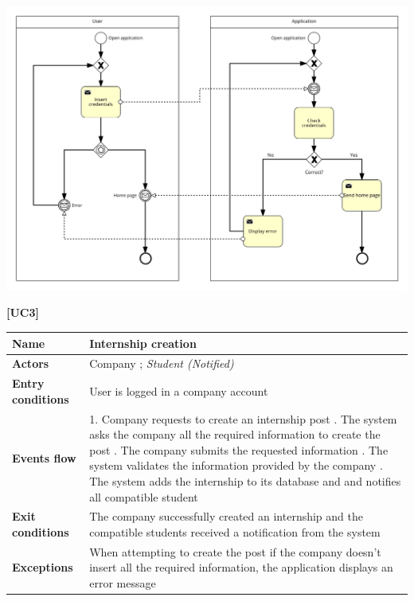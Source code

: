 \documentclass[11pt,twoside]{article}
\begin{document}
\begin{center}
\includegraphics[width=\textwidth]{Images/UC2}
\end{center}

\newpage

\large{\textbf{[UC3]}} \\
\begin{table}[H]
\begin{tabular}{| p{} | p{} |}
\hline
\textbf{Name}
& Internship creation \\
\hline
\textbf{Actors}
& Company ; \textit{Student (Notified)} \\
\hline
\textbf{Entry conditions}
& User is logged in a company account \\
\hline
\textbf{Events flow}
& 1. Company requests to create an internship post \newline
2. The system asks the company all the required information to create the post \newline
3. The company submits the requested information \newline
4. The system validates the information provided by the company \newline
5. The system adds the internship to its database and and notifies all compatible student \\
\hline
\textbf{Exit conditions}
& The company successfully created an internship and the compatible students received a notification from the system \\
\hline
\textbf{Exceptions}
& When attempting to create the post if the company doesn't insert all the required information, the application displays an error message \\
\hline
\end{tabular}
\end{table}
\end{document}

